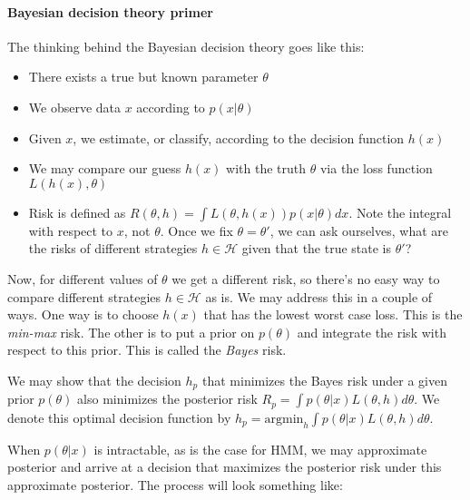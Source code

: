 \documentclass{article}
\begin{document}
\paragraph{Bayesian decision theory primer}
The thinking behind the Bayesian decision theory goes like this:
\begin{itemize}
    \item There exists a true but known parameter $\theta$
    \item We observe data $x$ according to $p(x|\theta)$
    \item Given $x$, we estimate, or classify, according to the decision function $h(x)$
    \item We may compare our guess $h(x)$ with the truth $\theta$ via the loss function $L(h(x), \theta)$
    \item Risk is defined as $R(\theta, h) = \int L(\theta, h(x)) p(x|\theta) dx$. Note the integral with respect to $x$, not $\theta$. Once we fix $\theta = \theta'$, we can ask ourselves, what are the risks of different strategies $h \in \mathcal{H} $ given that the true state is $\theta'$?
\end{itemize}

Now, for different values of $\theta$ we get a different risk, so there's no easy way to compare different strategies $h \in \mathcal{H}$ as is. We may address this in a couple of ways. One way is to choose $h(x)$ that has the lowest worst case loss. This is the \textit{min-max} risk. The other is to put a prior on $p(\theta)$ and integrate the risk with respect to this prior. This is called the \textit{Bayes} risk.

We may show that the decision $h_p$ that minimizes the Bayes risk under a given prior $p(\theta)$ also minimizes the posterior risk $R_p = \int p(\theta|x) L(\theta, h) d\theta$. We denote this optimal decision function by $h_p = \mathrm{argmin}_h \int p(\theta|x) L(\theta, h) d\theta$.

When $p(\theta|x)$ is intractable, as is the case for HMM, we may approximate posterior and arrive at a decision that maximizes the posterior risk under this approximate posterior. The process will look something like:
\end{document}
